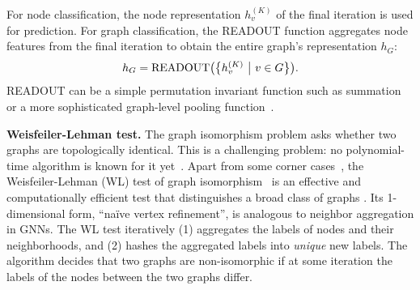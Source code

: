 For node classification, the node representation $h_v^{(K)}$ of the final iteration is used for prediction. For graph classification, the READOUT function aggregates node features from the final iteration to obtain the entire graph's representation $h_G$:
\begin{align}
    \label{eq:graph_pool}
    h_{G} = {\rm READOUT} \big(\big\lbrace h_v^{(K)} \ \big\vert \ v \in G \big\rbrace \big).
\end{align}
READOUT can be a simple permutation invariant function such as summation or a more sophisticated graph-level pooling function~\citep{ying2018hierarchical,zhang2018end}.
%



{\bf Weisfeiler-Lehman test.} The graph isomorphism problem asks whether two graphs are topologically identical. This is a challenging problem: no polynomial-time algorithm is known for it yet~\citep{garey1979guide, garey2002computers, babai2016graph}.
Apart from some corner cases~\citep{cai1992optimal}, the Weisfeiler-Lehman (WL) test of graph isomorphism~\citep{weisfeiler1968reduction} is an effective and computationally efficient test that distinguishes a broad class of graphs \citep{babai1979canonical}. Its 1-dimensional form, ``na\"ive vertex refinement'', is analogous to neighbor aggregation in GNNs.
%
The WL test iteratively (1) aggregates the labels of nodes and their neighborhoods, and (2) hashes the aggregated labels into \textit{unique} new labels. The algorithm decides that two graphs are non-isomorphic if at some iteration %
the labels of the nodes between the two graphs differ.

